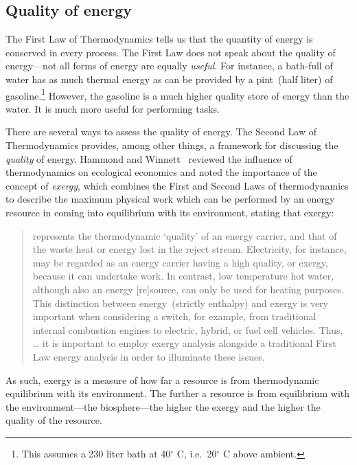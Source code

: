 \subsection{Quality of energy}
\label{sec:energy_quality}

The First Law of Thermodynamics
tells us that
the quantity of energy is conserved in every process.
The First Law
does not speak about the quality of energy---not
all forms of energy are equally \emph{useful}.
For instance,
a bath-full of water has as much thermal energy
as can be provided by a pint~(half liter) of
gasoline.\footnote{This assumes a 230 liter bath at
40$^\circ$ C,
i.e.\ 20$^\circ$ C above ambient.}
However, the gasoline is a much higher quality
store of energy than the water.
It is much more useful for performing tasks.

There are several ways to assess the quality of energy.
The Second Law of Thermodynamics provides, 
among other things,
a framework for discussing the \emph{quality} of energy.
Hammond and Winnett~\cite{Hammond:2009tu} reviewed
the influence of thermodynamics on ecological economics 
and noted the importance of the concept of \emph{exergy},
which combines the First
and Second
Laws of thermodynamics
to describe the maximum physical work 
which can be performed by an energy resource
in coming into equilibrium with its environment,
stating that exergy:

\begin{quote}
	represents the thermodynamic `quality' 
	of an energy carrier, 
	and that of the waste heat or energy lost in the reject stream. 
	Electricity, for instance, 
	may be regarded as an energy carrier having a high quality, 
	or exergy, because it can undertake work. 
	In contrast, low temperature hot water, 
	although also an energy [re]source, 
	can only be used for heating purposes. 
	This distinction between energy~(strictly enthalpy) 
	and exergy is very important 
	when considering a switch, for example, 
	from traditional internal combustion engines 
	to electric, hybrid, or fuel cell vehicles. 
	Thus, \ldots{} it is important to employ exergy analysis 
	alongside a traditional First Law energy analysis 
	in order to illuminate these issues.
\end{quote}

As such, exergy is a measure of how far a resource
is from thermodynamic equilibrium with its environment.
The further a resource is from equilibrium with the 
environment---the biosphere---the
higher the exergy and the higher the quality of the resource.

